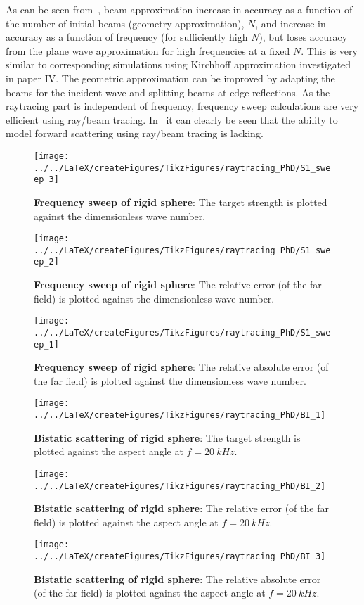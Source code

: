 As can be seen from~, beam approximation increase in accuracy as a function of the number of initial beams (geometry approximation), $N$, and increase in accuracy as a function of frequency (for sufficiently high $N$), but loses accuracy from the plane wave approximation for high frequencies at a fixed $N$. This is very similar to corresponding simulations using Kirchhoff approximation investigated in paper IV. The geometric approximation can be improved by adapting the beams for the incident wave and splitting beams at edge reflections. As the raytracing part is independent of frequency, frequency sweep calculations are very efficient using ray/beam tracing. In~ it can clearly be seen that the ability to model forward scattering using ray/beam tracing is lacking.
\begin{figure}
	\centering
	\texttt{[image: ../../LaTeX/createFigures/TikzFigures/raytracing\_PhD/S1\_sweep\_3]}
	\caption{\textbf{Frequency sweep of rigid sphere}: The target strength is plotted against the dimensionless wave number.}
	\label{Fig:S1_sweep3}
\end{figure}
\begin{figure}
	\centering
	\texttt{[image: ../../LaTeX/createFigures/TikzFigures/raytracing\_PhD/S1\_sweep\_2]}
	\caption{\textbf{Frequency sweep of rigid sphere}: The relative error (of the far field) is plotted against the dimensionless wave number.}
	\label{Fig:S1_sweep2}
\end{figure}
\begin{figure}
	\centering
	\texttt{[image: ../../LaTeX/createFigures/TikzFigures/raytracing\_PhD/S1\_sweep\_1]}
	\caption{\textbf{Frequency sweep of rigid sphere}: The relative absolute error (of the far field) is plotted against the dimensionless wave number.}
	\label{Fig:S1_sweep1}
\end{figure}
\begin{figure}
	\centering
	\texttt{[image: ../../LaTeX/createFigures/TikzFigures/raytracing\_PhD/BI\_1]}
	\caption{\textbf{Bistatic scattering of rigid sphere}: The target strength is plotted against the aspect angle at $f=\SI{20}{kHz}$.}
	\label{Fig:BI_1}
\end{figure}
\begin{figure}
	\centering
	\texttt{[image: ../../LaTeX/createFigures/TikzFigures/raytracing\_PhD/BI\_2]}
	\caption{\textbf{Bistatic scattering of rigid sphere}: The relative error (of the far field) is plotted against the aspect angle at $f=\SI{20}{kHz}$.}
	\label{Fig:BI_2}
\end{figure}
\begin{figure}
	\centering
	\texttt{[image: ../../LaTeX/createFigures/TikzFigures/raytracing\_PhD/BI\_3]}
	\caption{\textbf{Bistatic scattering of rigid sphere}: The relative absolute error (of the far field) is plotted against the aspect angle at $f=\SI{20}{kHz}$.}
	\label{Fig:BI_3}
\end{figure}

